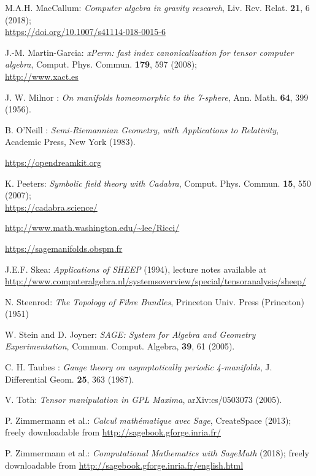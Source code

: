 \begin{thebibliography}{123}
M.A.H. MacCallum: {\em Computer algebra in gravity research},
Liv. Rev. Relat. {\bf 21}, 6 (2018);\\
\url{https://doi.org/10.1007/s41114-018-0015-6}

J.-M. Martin-Garcia: {\em xPerm: fast index canonicalization for tensor computer algebra}, Comput. Phys. Commun. {\bf 179}, 597 (2008);\\
\url{http://www.xact.es}

J. W. Milnor : {\em On manifolds homeomorphic to the 7-sphere},
Ann. Math. {\bf 64}, 399 (1956).

B. O'Neill : {\em Semi-Riemannian Geometry, with Applications to Relativity},
Academic Press, New York (1983).

\url{https://opendreamkit.org}

K. Peeters: {\em Symbolic field theory with Cadabra},
Comput. Phys. Commun. {\bf 15}, 550 (2007);\\
\url{https://cadabra.science/}

\url{http://www.math.washington.edu/~lee/Ricci/}

\url{https://sagemanifolds.obspm.fr}

J.E.F. Skea: \emph{Applications of SHEEP} (1994), lecture notes available at
\url{http://www.computeralgebra.nl/systemsoverview/special/tensoranalysis/sheep/}

N. Steenrod: \emph{The Topology of Fibre Bundles}, Princeton Univ. Press (Princeton) (1951)

W. Stein and D. Joyner: {\em SAGE: System for Algebra and Geometry Experimentation},
Commun. Comput. Algebra, {\bf 39}, 61 (2005).

C. H. Taubes : {\em Gauge theory on asymptotically periodic 4-manifolds},
J. Differential Geom. {\bf 25}, 363 (1987).

V. Toth: {\em Tensor manipulation in GPL Maxima},
arXiv:cs/0503073 (2005).

P. Zimmermann et al.: {\it Calcul math\'ematique avec Sage}, CreateSpace (2013);
freely downloadable from \url{http://sagebook.gforge.inria.fr/}

P. Zimmermann et al.: {\it Computational Mathematics with SageMath} (2018);
freely downloadable from \url{http://sagebook.gforge.inria.fr/english.html}

\end{thebibliography}
